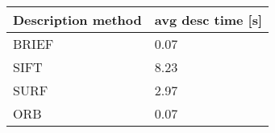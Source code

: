 \begin{tabular}{ l l }
	Description method & avg desc time [s] \\
	\hline
	 BRIEF & 0.07 \\
	 SIFT & 8.23 \\
	 SURF & 2.97 \\
	 ORB & 0.07
\end{tabular}